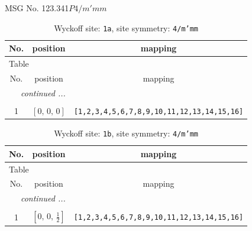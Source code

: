 \documentclass[fleqn,8pt]{jsarticle}
\begin{document}
\setcounter{MaxMatrixCols}{32}

\renewcommand{\tablename}{Table~}
\renewcommand{\figurename}{Figure~}
\begin{center}
\LARGE
MSG No. 123.341\quad$P4/m'mm$
\end{center}
\renewcommand{\arraystretch}{1.2}
\begin{longtable}{ccc}
\caption{Wyckoff site: {\tt 1a}, site symmetry: {\tt 4/m'mm}}
 \\
 \hline \hline
No. & position & mapping \\ \hline \endfirsthead

\multicolumn{2}{l}{\tablename\ \thetable{}} \\
 \hline \hline
No. & position & mapping \\ \hline \endhead

 \hline \hline
\multicolumn{2}{r}{\footnotesize\it continued ...} \\ \endfoot

 \hline \hline
\multicolumn{2}{r}{} \\ \endlastfoot

1 & $\left[ 0,\, 0,\, 0 \right]$ & {\tt [1,2,3,4,5,6,7,8,9,10,11,12,13,14,15,16]} \\
\end{longtable}
\renewcommand{\arraystretch}{1.2}
\begin{longtable}{ccc}
\caption{Wyckoff site: {\tt 1b}, site symmetry: {\tt 4/m'mm}}
 \\
 \hline \hline
No. & position & mapping \\ \hline \endfirsthead

\multicolumn{2}{l}{\tablename\ \thetable{}} \\
 \hline \hline
No. & position & mapping \\ \hline \endhead

 \hline \hline
\multicolumn{2}{r}{\footnotesize\it continued ...} \\ \endfoot

 \hline \hline
\multicolumn{2}{r}{} \\ \endlastfoot

1 & $\left[ 0,\, 0,\, \frac{1}{2} \right]$ & {\tt [1,2,3,4,5,6,7,8,9,10,11,12,13,14,15,16]} \\
\end{longtable}
\renewcommand{\arraystretch}{1.2}
\end{document}
